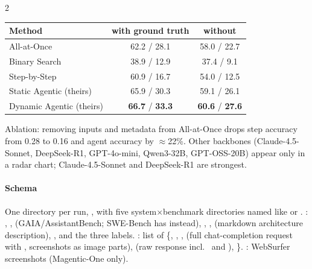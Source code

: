 \begin{multicols}{2}
\begin{center}\small
\begin{tabular}{@{}lcc@{}}\toprule
Method & with ground truth & without\\\midrule
All-at-Once & 62.2 / 28.1 & 58.0 / 22.7\\
Binary Search & 38.9 / 12.9 & 37.4 / 9.1\\
Step-by-Step & 60.9 / 16.7 & 54.0 / 12.5\\
Static Agentic (theirs) & 65.9 / 30.3 & 59.1 / 26.1\\
Dynamic Agentic (theirs) & \textbf{66.7} / \textbf{33.3} & \textbf{60.6} / \textbf{27.6}\\\bottomrule
\end{tabular}
\end{center}
Ablation: removing inputs and metadata from All-at-Once drops step accuracy from 0.28 to 0.16 and agent accuracy by $\approx$22\%. Other backbones (Claude-4.5-Sonnet, DeepSeek-R1, GPT-4o-mini, Qwen3-32B, GPT-OSS-20B) appear only in a radar chart; Claude-4.5-Sonnet and DeepSeek-R1 are strongest.

\paragraph{Schema} One directory per run, , with five system$\times$benchmark directories named like  or . : , ,  (GAIA/AssistantBench; SWE-Bench has  instead), , ,  (markdown architecture description), , and the three labels. : list of \{, , ,  (full chat-completion request with , screenshots as image parts),  (raw response incl.\  and ), \}. : WebSurfer screenshots (Magentic-One only).
\end{multicols}

